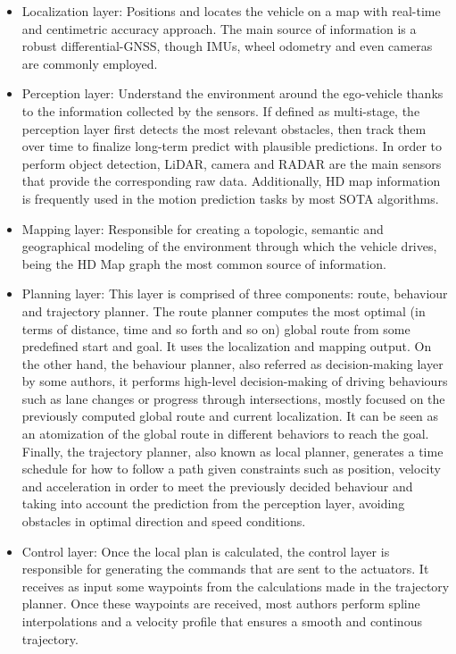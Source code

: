 \begin{itemize}
	\item Localization layer: Positions and locates the vehicle on a map with real-time and centimetric accuracy approach. The main source of information is a robust differential-GNSS, though IMUs, wheel odometry and even cameras are commonly employed. 
	\item Perception layer: Understand the environment around the ego-vehicle thanks to the information collected by the sensors. If defined as multi-stage, the perception layer first detects the most relevant obstacles, then track them over time to finalize long-term predict with plausible predictions. In order to perform object detection, LiDAR, camera and RADAR are the main sensors that provide the corresponding raw data. Additionally, HD map information is frequently used in the motion prediction tasks by most \ac{SOTA} algorithms.
	\item Mapping layer: Responsible for creating a topologic, semantic and geographical modeling of the environment through which the vehicle drives, being the HD Map graph the most common source of information.
	\item Planning layer: This layer is comprised of three components: route, behaviour and trajectory planner. The route planner computes the most optimal (in terms of distance, time and so forth and so on) global route from some predefined start and goal. It uses the localization and mapping output. On the other hand, the behaviour planner, also referred as decision-making layer by some authors, it performs high-level decision-making of driving behaviours such as lane changes or progress through intersections, mostly focused on the previously computed global route and current localization. It can be seen as an atomization of the global route in different behaviors to reach the goal. Finally, the trajectory planner, also known as local planner, generates a time schedule for how to follow a path given constraints such as position, velocity and acceleration in order to meet the previously decided behaviour and taking into account the prediction from the perception layer, avoiding obstacles in optimal direction and speed conditions.
	\item Control layer: Once the local plan is calculated, the control layer is responsible for generating the commands that are sent to the actuators. It receives as input some waypoints from the calculations made in the trajectory planner. Once these waypoints are received, most authors perform spline interpolations and a velocity profile that ensures a smooth and continous trajectory. 
\end{itemize}

